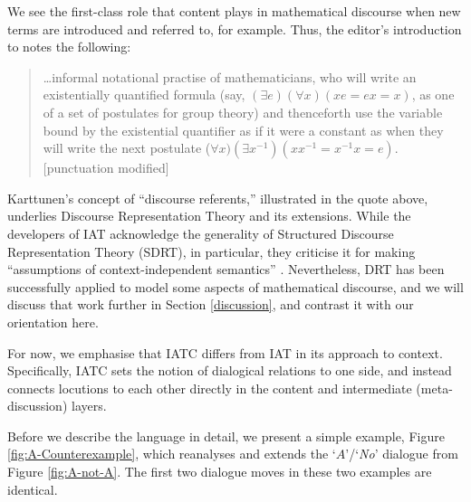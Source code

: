 \documentclass[smallextended,oneside]{svjour3}       %
\let\cite\citep
\newcommand\nothing[1]{#1}
\let\paragraph\nothing
\begin{document}
\paragraph{We see the first-class role that content plays in mathematical discourse when new terms are introduced and referred to, for example.}
Thus, the editor's introduction to
\citet{karttunen1976discourse} notes the following:
\begin{quote}
\ldots informal notational practise of mathematicians, who will write
an existentially quantified formula (say, $(\exists e)(\forall x)(xe =
ex = x)$, as one of a set of postulates for group theory) and
thenceforth use the variable bound by the existential quantifier as if
it were a constant as when they will write the next postulate ($\forall
x)(\exists x^{-1})(xx^{-1} = x^{-1}x = e)$. [punctuation modified]
\end{quote}
Karttunen's concept of ``discourse referents,'' illustrated in the
quote above, underlies Discourse Representation Theory \cite{kamp1993discourse}
and its extensions.
While the developers of IAT acknowledge the generality of Structured
Discourse Representation Theory (SDRT), in particular, they criticise
it for making ``assumptions of context-independent semantics''
\cite{budzynska2016theoretical}.
Nevertheless, DRT has been successfully applied to model some aspects
of mathematical discourse,
and we will discuss that work further in Section \ref{discussion},
and contrast it with our orientation here.

For now, we emphasise that IATC differs from IAT in its approach to
context.
Specifically, IATC sets the notion of dialogical relations to one side, and
instead connects locutions to each other directly in the content and
intermediate (meta-discussion) layers. 

Before we describe the language
in detail, we present a simple example, Figure \ref{fig:A-Counterexample}, which reanalyses and extends the `$A$'/`\emph{No}' dialogue from Figure \ref{fig:A-not-A}.  The first two
dialogue moves in these two examples are identical.
\end{document}
